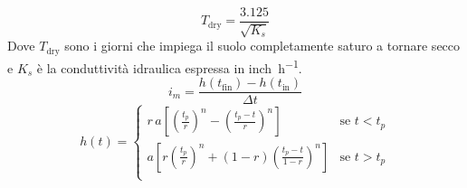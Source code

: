 \begin{equation}
    T_{\text{dry}} = \frac{3.125}{\sqrt{K_s}}
\end{equation}
Dove $T_{\text{dry}}$ sono i giorni che impiega il suolo completamente saturo a tornare secco e $K_s$ è la conduttività idraulica espressa in \si{inch\per\hour}.
\begin{equation}
    i_m = \frac{h(t_\text{fin}) - h(t_\text{in})}{\Delta t}
\end{equation}
\begin{equation}   
    h(t) = 
    \begin{cases}
        r \, a \left[ \left( \frac{t_p}{r}\right)^n - \left( \frac{t_p - t}{r}\right)^n  \right] & \text{se $t < t_p$}\\
        a \left[ r \left( \frac{t_p}{r}\right)^n + (1-r)\left( \frac{t_p - t}{1 - r}\right)^n  \right] & \text{se $t > t_p$}\\
    \end{cases}
\end{equation}
 


















